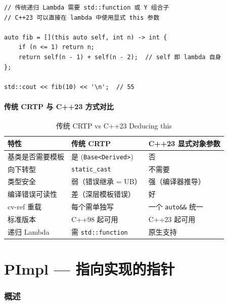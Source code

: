 \documentclass[12pt,a4paper,fontset=fandol]{ctexbook}
\begin{document}
\begin{lstlisting}[caption={C++23 递归 Lambda}]
// 传统递归 Lambda 需要 std::function 或 Y 组合子
// C++23 可以直接在 lambda 中使用显式 this 参数

auto fib = [](this auto self, int n) -> int {
    if (n <= 1) return n;
    return self(n - 1) + self(n - 2);  // self 即 lambda 自身
};

std::cout << fib(10) << '\n';  // 55
\end{lstlisting}

\subsection{传统 CRTP 与 C++23 方式对比}

\begin{table}[h]
\centering
\caption{传统 CRTP vs C++23 Deducing this}
\label{tab:crtp-compare}
\begin{tabular}{@{}lll@{}}
\toprule
\textbf{特性} & \textbf{传统 CRTP} & \textbf{C++23 显式对象参数} \\
\midrule
基类是否需要模板  & 是 (\texttt{Base<Derived>})  & 否 \\
向下转型          & \texttt{static\_cast}        & 不需要 \\
类型安全          & 弱（错误继承 = UB）         & 强（编译器推导） \\
编译错误可读性    & 差（深层模板错误）          & 好 \\
cv-ref 重载       & 每个需单独写               & 一个 \texttt{auto\&\&} 统一 \\
标准版本          & C++98 起可用               & C++23 起可用 \\
递归 Lambda       & 需 \texttt{std::function}   & 原生支持 \\
\bottomrule
\end{tabular}
\end{table}

\newpage

\part{PImpl — 指向实现的指针}

\section{概述}
\end{document}
